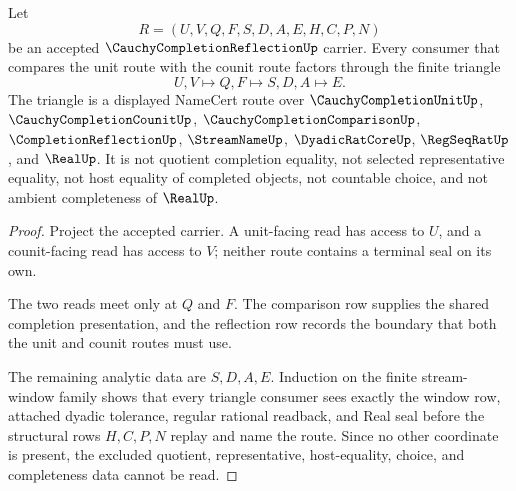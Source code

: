 \begin{theorem}
\label{thm:cauchy-completion-reflection-unit-counit-triangle}
Let
$$
R=(U,V,Q,F,S,D,A,E,H,C,P,N)
$$
be an accepted $\CauchyCompletionReflectionUp$ carrier. Every consumer that compares the unit route with the counit route factors through the finite triangle
$$
U,V \longmapsto Q,F \longmapsto S,D,A \longmapsto E .
$$
The triangle is a displayed NameCert route over $\CauchyCompletionUnitUp$, $\CauchyCompletionCounitUp$, $\CauchyCompletionComparisonUp$, $\CompletionReflectionUp$, $\StreamNameUp$, $\DyadicRatCoreUp$, $\RegSeqRatUp$, and $\RealUp$. It is not quotient completion equality, not selected representative equality, not host equality of completed objects, not countable choice, and not ambient completeness of $\RealUp$.
\end{theorem}
\begin{proof}
Project the accepted carrier. A unit-facing read has access to $U$, and a counit-facing read has access to $V$; neither route contains a terminal seal on its own.

The two reads meet only at $Q$ and $F$. The comparison row supplies the shared completion presentation, and the reflection row records the boundary that both the unit and counit routes must use.

The remaining analytic data are $S,D,A,E$. Induction on the finite stream-window family shows that every triangle consumer sees exactly the window row, attached dyadic tolerance, regular rational readback, and Real seal before the structural rows $H,C,P,N$ replay and name the route. Since no other coordinate is present, the excluded quotient, representative, host-equality, choice, and completeness data cannot be read.
\end{proof}

